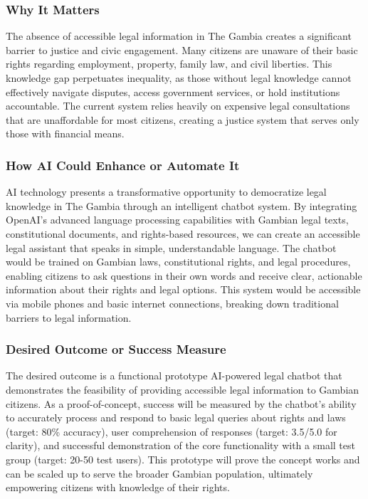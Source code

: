 \documentclass[12pt]{article}
\begin{document}
\subsubsection{Why It Matters}
The absence of accessible legal information in The Gambia creates a significant barrier to justice and civic engagement. Many citizens are unaware of their basic rights regarding employment, property, family law, and civil liberties. This knowledge gap perpetuates inequality, as those without legal knowledge cannot effectively navigate disputes, access government services, or hold institutions accountable. The current system relies heavily on expensive legal consultations that are unaffordable for most citizens, creating a justice system that serves only those with financial means.

\subsubsection{How AI Could Enhance or Automate It}
AI technology presents a transformative opportunity to democratize legal knowledge in The Gambia through an intelligent chatbot system. By integrating OpenAI's advanced language processing capabilities with Gambian legal texts, constitutional documents, and rights-based resources, we can create an accessible legal assistant that speaks in simple, understandable language. The chatbot would be trained on Gambian laws, constitutional rights, and legal procedures, enabling citizens to ask questions in their own words and receive clear, actionable information about their rights and legal options. This system would be accessible via mobile phones and basic internet connections, breaking down traditional barriers to legal information.

\subsubsection{Desired Outcome or Success Measure}
The desired outcome is a functional prototype AI-powered legal chatbot that demonstrates the feasibility of providing accessible legal information to Gambian citizens. As a proof-of-concept, success will be measured by the chatbot's ability to accurately process and respond to basic legal queries about rights and laws (target: 80\% accuracy), user comprehension of responses (target: 3.5/5.0 for clarity), and successful demonstration of the core functionality with a small test group (target: 20-50 test users). This prototype will prove the concept works and can be scaled up to serve the broader Gambian population, ultimately empowering citizens with knowledge of their rights.
\end{document}
